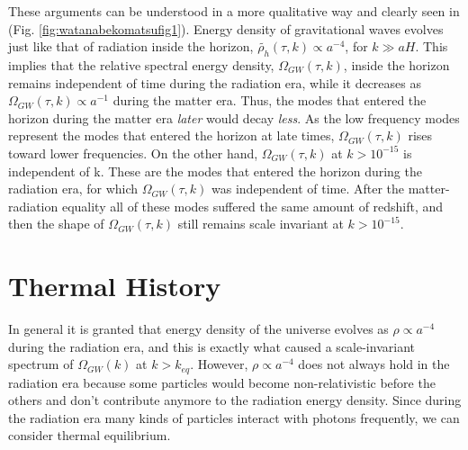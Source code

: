 \documentclass[11pt,a4paper,twoside]{book}
\begin{document}
These arguments can be understood in a more qualitative way and clearly seen in (Fig. \ref{fig:watanabekomatsufig1}). Energy density of gravitational waves evolves just like that of radiation inside the horizon, $ \tilde{\rho_{h}}(\tau,k) \propto a^{-4} $, for $ k\gg aH $. This implies that the relative spectral energy density, $ \Omega_{GW}(\tau,k) $, inside the horizon remains independent of time during the radiation era, while it decreases as $ \Omega_{GW}(\tau,k) \propto a^{-1} $ during the matter era. Thus, the modes that entered the horizon during the matter era \textit{later} would decay \textit{less}. As the low frequency modes represent the modes that entered the horizon at late times, $\Omega_{GW}(\tau,k)$ rises toward lower frequencies. On the other hand,  $\Omega_{GW}(\tau,k)$ at $  k > 10^{-15} $ is independent of k. These are the modes that entered the horizon  during the radiation era, for which $ \Omega_{GW} (\tau,k) $ was independent of time. After the matter-radiation equality all of these modes suffered the same amount of redshift, and then the shape of $\Omega_{GW}(\tau,k)$ still remains scale invariant at  $  k > 10^{-15} $.
\section{Thermal History}
In general it is granted that energy density of the universe evolves as $ \rho \propto a^{-4} $ during the radiation era, and this is exactly what caused a scale-invariant spectrum of $ \Omega_{GW}(k) $ at $ k > k_{eq}  $. However, $\rho \propto a^{-4}$ does not always hold in the radiation era because some particles would become non-relativistic before the others and don't contribute anymore to the radiation energy density. Since during the radiation era many kinds of particles interact with photons frequently, we can consider thermal equilibrium.
\end{document}
